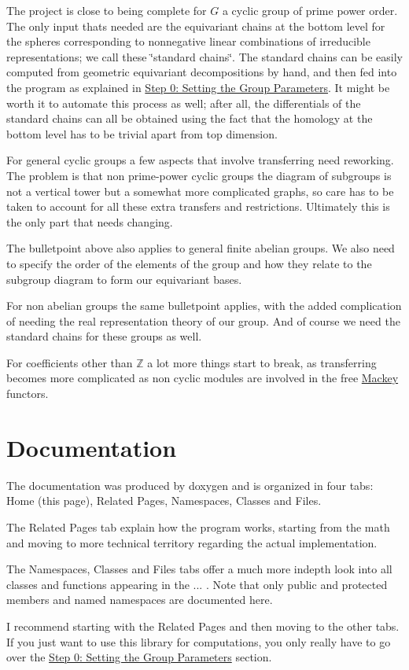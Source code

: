 \begin{DoxyItemize}
\item The project is close to being complete for $G$ a cyclic group of prime power order. The only input that\textquotesingle{}s needed are the equivariant chains at the bottom level for the spheres corresponding to nonnegative linear combinations of irreducible representations; we call these \char`\"{}standard chains\char`\"{}. The standard chains can be easily computed from geometric equivariant decompositions by hand, and then fed into the program as explained in \hyperlink{use_how}{Step 0\+: Setting the Group Parameters}. It might be worth it to automate this process as well; after all, the differentials of the standard chains can all be obtained using the fact that the homology at the bottom level has to be trivial apart from top dimension.
\item For general cyclic groups a few aspects that involve transferring need reworking. The problem is that non prime-\/power cyclic groups the diagram of subgroups is not a vertical tower but a somewhat more complicated graphs, so care has to be taken to account for all these extra transfers and restrictions. Ultimately this is the only part that needs changing.
\item The bulletpoint above also applies to general finite abelian groups. We also need to specify the order of the elements of the group and how they relate to the subgroup diagram to form our equivariant bases.
\item For non abelian groups the same bulletpoint applies, with the added complication of needing the real representation theory of our group. And of course we need the standard chains for these groups as well.
\item For coefficients other than $\mathbb Z$ a lot more things start to break, as transferring becomes more complicated as non cyclic modules are involved in the free \hyperlink{namespaceMackey}{Mackey} functors.
\end{DoxyItemize}\hypertarget{index_doc}{}\section{Documentation}\label{index_doc}
The documentation was produced by doxygen and is organized in four tabs\+: Home (this page), Related Pages, Namespaces, Classes and Files.


\begin{DoxyItemize}
\item The Related Pages tab explain how the program works, starting from the math and moving to more technical territory regarding the actual implementation.
\item The Namespaces, Classes and Files tabs offer a much more indepth look into all classes and functions appearing in the ... . Note that only public and protected members and named namespaces are documented here.
\end{DoxyItemize}

I recommend starting with the Related Pages and then moving to the other tabs. If you just want to use this library for computations, you only really have to go over the \hyperlink{use_how}{Step 0\+: Setting the Group Parameters} section. 